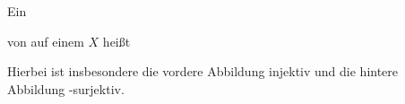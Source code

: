 {}
{





Ein

 {  }

von
auf einem
$X$ heißt





}
Hierbei ist insbesondere die vordere Abbildung injektiv und die hintere Abbildung
 {} {-}surjektiv.





